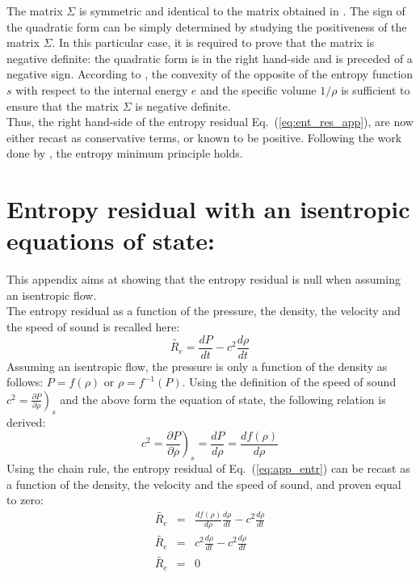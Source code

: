 \documentclass[preprint,10pt]{elsarticle}
\newcommand{\resi}{R_e}
\newcommand{\resinew}{\widetilde{\resi}}
\newcommand{\eqt}[1]{Eq.~(\ref{#1})}                     %
\begin{document}
%
The matrix $\Sigma$ is symmetric and identical to the matrix obtained in \cite{jlg}. The sign of the quadratic form can be simply determined by studying the positiveness of the matrix $\Sigma$. In this particular case, it is required to prove that the matrix is negative definite: the quadratic form is in the right hand-side and is preceded of a negative sign. According to \cite{jlg}, the convexity of the opposite of the entropy function $s$ with respect to the internal energy $e$ and the specific volume $1/ \rho$ is sufficient to ensure that the matrix $\Sigma$ is negative definite. \\
Thus, the right hand-side of the entropy residual \eqt{eq:ent_res_app}, are now either recast as conservative terms, or known to be positive. Following the work done by \cite{jlg}, the entropy minimum principle holds.

\newpage
\section{Entropy residual with an isentropic equations of state:} \label{app:ise_equ}

This appendix aims at showing that the entropy residual is null when assuming an isentropic flow. \\
The entropy residual as a function of the pressure, the density, the velocity and the speed of sound is recalled here:
%
\begin{equation}\label{eq:app_entr}
\resinew = \frac{dP}{dt} - c^2 \frac{d \rho}{dt}
\end{equation}
%
Assuming an isentropic flow, the pressure is only a function of the density as follows: $P = f( \rho )$ or $\rho = f^{-1}( P )$. Using the definition of the speed of sound $c^2 = \left. \frac{\partial P}{\partial \rho} \right)_s$ and the above form the equation of state, the following relation is derived:
%
\begin{equation}\label{eq:app_sp}
c^2 = \left. \frac{\partial P}{\partial \rho} \right)_s = \frac{d P}{d \rho} = \frac{d f(\rho)}{d \rho}
\end{equation}
%
Using the chain rule, the entropy residual of \eqt{eq:app_entr} can be recast as a function of the density, the velocity and the speed of sound, and proven equal to zero:
%
\begin{eqnarray*}
\resinew &=& \frac{d f(\rho)}{d \rho} \frac{d\rho}{dt} - c^2 \frac{d \rho}{dt} \\
\resinew &=& c^2 \frac{d\rho}{dt} - c^2 \frac{d \rho}{dt} \\
\resinew &=&  0 
\end{eqnarray*}

\end{document}
